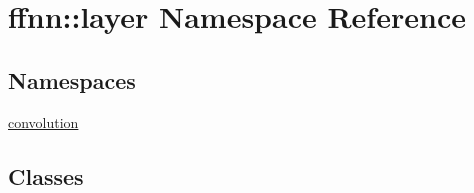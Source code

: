 \hypertarget{namespaceffnn_1_1layer}{\section{ffnn\-:\-:layer Namespace Reference}
\label{namespaceffnn_1_1layer}
}
\subsection*{Namespaces}
\begin{DoxyCompactItemize}
\item 
\hyperlink{namespaceffnn_1_1layer_1_1convolution}{convolution}
\end{DoxyCompactItemize}
\subsection*{Classes}
